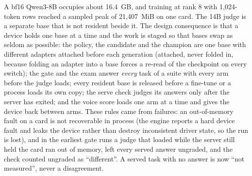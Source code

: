 A bf16 Qwen3-8B occupies about 16.4~GB, and training at rank 8 with 1,024-token rows reached
a sampled peak of 21,407~MiB on one card. The 14B judge is a separate base that is not resident beside it. The
design consequence is that a device holds one base at a time and the work is staged so
that bases swap as seldom as possible: the policy, the candidate and the champion are one
base with different adapters attached before each generation (attached, never folded in,
because folding an adapter into a base forces a re-read of the checkpoint on every
switch); the gate and the exam answer \emph{every} task of a suite with every arm before the
judge loads; every resident base is released before a fine-tune or a 
process loads its own copy; the serve check judges its answers only after the server has
exited; and the voice score loads one arm at a time and gives the device back between arms.
These rules came from failures: an out-of-memory fault on a card is not recoverable in
process (the engine reports a hard device fault and leaks the device rather than destroy
inconsistent driver state, so the run is lost), and in the earliest gate runs a judge that loaded while the server still held the
card ran out of memory, left every served answer ungraded, and the check counted ungraded
as ``different''. A served task with no answer is now ``not measured'', never a disagreement.

